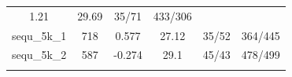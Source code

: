\documentclass[]{article}
\begin{document}
\begin{longtable}[]{@{}cccccc@{}}
\begin{minipage}[t]{0.11\columnwidth}
1.21\strut
\end{minipage} & \begin{minipage}[t]{0.13\columnwidth}\centering\strut
29.69\strut
\end{minipage} & \begin{minipage}[t]{0.18\columnwidth}\centering\strut
35/71\strut
\end{minipage} & \begin{minipage}[t]{0.22\columnwidth}\centering\strut
433/306\strut
\end{minipage}\tabularnewline
\begin{minipage}[t]{0.11\columnwidth}\centering\strut
sequ\_5k\_1\strut
\end{minipage} & \begin{minipage}[t]{0.07\columnwidth}\centering\strut
718\strut
\end{minipage} & \begin{minipage}[t]{0.11\columnwidth}\centering\strut
0.577\strut
\end{minipage} & \begin{minipage}[t]{0.13\columnwidth}\centering\strut
27.12\strut
\end{minipage} & \begin{minipage}[t]{0.18\columnwidth}\centering\strut
35/52\strut
\end{minipage} & \begin{minipage}[t]{0.22\columnwidth}\centering\strut
364/445\strut
\end{minipage}\tabularnewline
\begin{minipage}[t]{0.11\columnwidth}\centering\strut
sequ\_5k\_2\strut
\end{minipage} & \begin{minipage}[t]{0.07\columnwidth}\centering\strut
587\strut
\end{minipage} & \begin{minipage}[t]{0.11\columnwidth}\centering\strut
-0.274\strut
\end{minipage} & \begin{minipage}[t]{0.13\columnwidth}\centering\strut
29.1\strut
\end{minipage} & \begin{minipage}[t]{0.18\columnwidth}\centering\strut
45/43\strut
\end{minipage} & \begin{minipage}[t]{0.22\columnwidth}\centering\strut
478/499\strut
\end{minipage}\tabularnewline
\begin{minipage}[t]{0.11\columnwidth}\centering\strut

\end{minipage}
\end{longtable}
\end{document}
